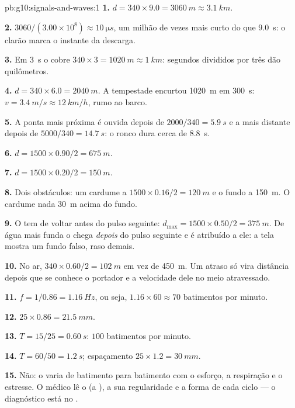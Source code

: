 \begin{solution}{pb:g10:signals-and-waves:1}
\textbf{1.} $d = 340 \times 9.0 = \qty{3060}{m} \approx \qty{3.1}{km}$.

\textbf{2.} $3060/(3.00\times10^{8}) \approx \qty{10}{\micro s}$, um
milhão de vezes mais curto do que \qty{9.0}{s}: o clarão marca o instante
da descarga.

\textbf{3.} Em \qty{3}{s} o  cobre
$340 \times 3 = \qty{1020}{m} \approx \qty{1}{km}$: segundos divididos
por três dão quilômetros.

\textbf{4.} $d = 340 \times 6.0 = \qty{2040}{m}$. A tempestade encurtou
\qty{1020}{m} em \qty{300}{s}:
$v = \qty{3.4}{m/s} \approx \qty{12}{km/h}$, rumo ao barco.

\textbf{5.} A ponta mais próxima é ouvida depois de
$2000/340 = \qty{5.9}{s}$ e a mais distante depois de
$5000/340 = \qty{14.7}{s}$: o ronco dura cerca de \qty{8.8}{s}.

\textbf{6.} $d = 1500 \times 0.90/2 = \qty{675}{m}$.

\textbf{7.} $d = 1500 \times 0.20/2 = \qty{150}{m}$.

\textbf{8.} Dois obstáculos: um cardume a
$1500 \times 0.16/2 = \qty{120}{m}$ e o fundo a \qty{150}{m}. O cardume
nada \qty{30}{m} acima do fundo.

\textbf{9.} O  tem de voltar antes do pulso seguinte:
$d_{\max} = 1500 \times 0.50/2 = \qty{375}{m}$. De água mais funda o 
chega \emph{depois} do pulso seguinte e é atribuído a ele: a tela mostra
um fundo falso, raso demais.

\textbf{10.} No ar, $340 \times 0.60/2 = \qty{102}{m}$ em vez de
\qty{450}{m}. Um atraso só vira distância depois que se conhece o
portador e a velocidade dele no meio atravessado.

\textbf{11.} $f = 1/0.86 = \qty{1.16}{Hz}$, ou seja,
$1.16 \times 60 \approx 70$ batimentos por minuto.

\textbf{12.} $25 \times 0.86 = \qty{21.5}{mm}$.

\textbf{13.} $T = 15/25 = \qty{0.60}{s}$: $100$ batimentos por minuto.

\textbf{14.} $T = 60/50 = \qty{1.2}{s}$; espaçamento
$25 \times 1.2 = \qty{30}{mm}$.

\textbf{15.} Não: o  varia de batimento para batimento com o
esforço, a respiração e o estresse. O médico lê o  (a ),
a sua regularidade e a forma de cada ciclo --- o diagnóstico está no
.


\end{solution}
